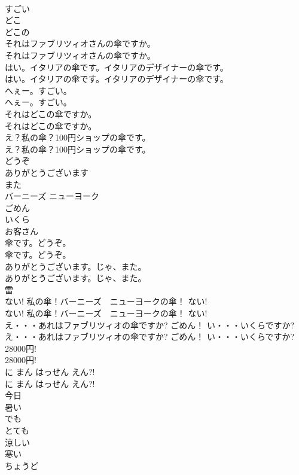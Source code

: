 \documentclass[8pt]{extreport}
\begin{document}
\begin{CJK}{UTF8}{min}
\\	すごい
\\	どこ
\\	どこの
\\	それはファブリツィオさんの傘ですか。	
\\	それはファブリツィオさんの傘ですか。 
\\	はい。イタリアの傘です。イタリアのデザイナーの傘です。	
\\	はい。イタリアの傘です。イタリアのデザイナーの傘です。 
\\	へぇー。すごい。	
\\	へぇー。すごい。 
\\	それはどこの傘ですか。	
\\	それはどこの傘ですか。 
\\	え？私の傘？100円ショップの傘です。	
\\	え？私の傘？100円ショップの傘です。 
\\	どうぞ
\\	ありがとうございます
\\	また
\\	バーニーズ ニューヨーク
\\	ごめん
\\	いくら
\\	お客さん
\\	傘です。どうぞ。	
\\	傘です。どうぞ。 
\\	ありがとうございます。じゃ、また。	
\\	ありがとうございます。じゃ、また。 
\\	雷	
\\	ない! 私の傘！バーニーズ　ニューヨークの傘！ ない!	
\\	ない! 私の傘！バーニーズ　ニューヨークの傘！ ない! 
\\	え・・・あれはファブリツィオの傘ですか? ごめん！ い・・・いくらですか?	
\\	え・・・あれはファブリツィオの傘ですか? ごめん！ い・・・いくらですか? 
\\	28000円!	
\\	28000円! 
\\	に まん はっせん えん?!	
\\	に まん はっせん えん?! 
\\	今日
\\	暑い
\\	でも
\\	とても
\\	涼しい
\\	寒い
\\	ちょうど

\end{CJK}
\end{document}

